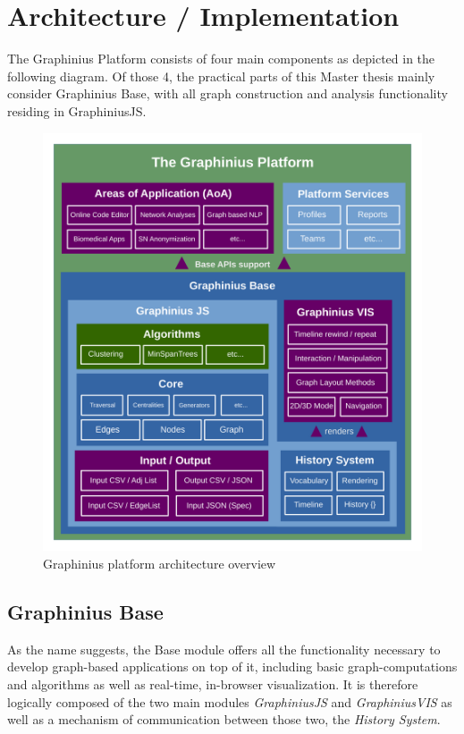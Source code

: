 \chapter{Architecture / Implementation}
\label{ch:implementation}

The Graphinius Platform consists of four main components as depicted in the following diagram. Of those 4, the practical parts of this Master thesis mainly consider Graphinius Base, with all graph construction and analysis functionality residing in GraphiniusJS. 

\begin{figure}[H]
	\centering
	\hspace*{-0.5cm}
	\includegraphics[width=1.05\textwidth]{figures/Graphinius_Architecture_new}
	\caption{Graphinius platform architecture overview}
	\label{fig:graphinius_architecture}
\end{figure}


\section{Graphinius Base}
\label{sect:graphinius_base}

As the name suggests, the Base module offers all the functionality necessary to develop graph-based applications on top of it, including basic graph-computations and algorithms as well as real-time, in-browser visualization. It is therefore logically composed of the two main modules \textit{GraphiniusJS} and \textit{GraphiniusVIS} as well as a mechanism of communication between those two, the \textit{History System}.

